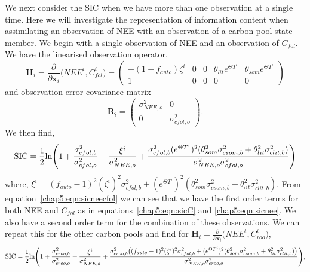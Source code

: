 We next consider the SIC when we have more than one observation at a single time. Here we will investigate the representation of information content when assimilating an observation of NEE with an observation of a carbon pool state member. We begin with a single observation of NEE and an observation of \(C_{fol}\). We have the linearised observation operator,
\begin{equation}
\textbf{H}_{i} = \frac{\partial}{\partial \textbf{x}_{i}}\big(NEE^{i}, C_{fol}^{i} \big) =
 \begin{pmatrix}
-(1-f_{auto})\zeta^i & 0 & 0 & \theta_{lit} e^{\Theta T^{i}} & \theta_{som} e^{\Theta T^{i}}\\
1 & 0 & 0 & 0 & 0
\end{pmatrix}
\end{equation}
and observation error covariance matrix
\begin{equation}
\mathbf{R}_i = \begin{pmatrix}
\sigma_{NEE,o}^{2} & 0 \\
0 & \sigma_{cfol,o}^{2}
\end{pmatrix}.
\end{equation}
We then find,
\begin{equation}
\text{SIC} = \frac{1}{2}\text{ln} \Bigg( 1 + \frac{\sigma_{cfol,b}^{2}}{\sigma_{cfol,o}^{2}} + \frac{\xi^{i}}{\sigma_{NEE,o}^{2}} + \\
 \frac{\sigma_{cfol,b}^{2}(e^{\Theta T^{i}})^2(\theta_{som}^2\sigma_{csom,b}^2+\theta_{lit}^2\sigma_{clit,b}^2)}{\sigma_{NEE,o}^{2}\sigma_{cfol,o}^{2}} \Bigg) \label{chap5:eqn:sicneecfol}
 \end{equation}
 where, \( \xi^{i} = (f_{auto}-1)^{2}(\zeta^{i})^{2}\sigma_{cfol,b}^{2} + (e^{\Theta T^{i}})^2(\theta_{som}^2\sigma_{csom,b}^2+\theta_{lit}^2\sigma_{clit,b}^2) \). From equation~\eqref{chap5:eqn:sicneecfol} we can see that we have the first order terms for both NEE and \(C_{fol}\) as in equations~\eqref{chap5:eqn:sicC} and \eqref{chap5:eqn:sicnee}. We also have a second order term for the combination of these observations. We can repeat this for the other carbon pools and find for \(\textbf{H}_{i} = \frac{\partial}{\partial \textbf{x}_{i}}\big(NEE^{i}, C_{roo}^{i} \big) \),
\begin{equation}
\text{SIC} = \frac{1}{2}\text{ln} \Bigg( 1 + \frac{\sigma_{croo,b}^{2}}{\sigma_{croo,o}^{2}} + \frac{\xi^{i}}{\sigma_{NEE,o}^{2}} + \\
 \frac{\sigma_{croo,b}^{2}\big((f_{auto}-1)^{2}(\zeta^{i})^{2}\sigma_{cfol,b}^{2} + (e^{\Theta T^{i}})^2(\theta_{som}^2\sigma_{csom,b}^2+\theta_{lit}^2\sigma_{clit,b}^2)\big)}{\sigma_{NEE,o}^{2}\sigma_{croo,o}^{2}} \Bigg), \label{chap5:eqn:sicneecroo}
 \end{equation} 
